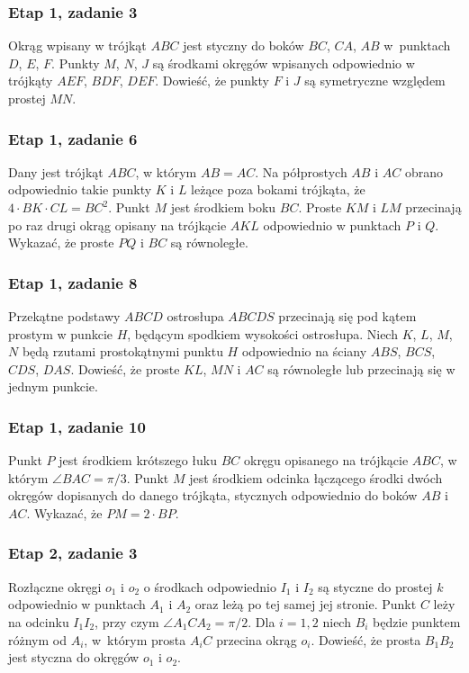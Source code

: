 
\subsubsection{Etap 1, zadanie 3}
Okrąg wpisany w trójkąt $ABC$ jest styczny do boków $BC$, $CA$, $AB$ w~punktach $D$, $E$, $F$.
Punkty $M$, $N$, $J$ są środkami okręgów wpisanych odpowiednio w trójkąty $AEF$, $BDF$, $DEF$.
Dowieść, że punkty $F$ i $J$ są symetryczne względem prostej $MN$.

\subsubsection{Etap 1, zadanie 6}
Dany jest trójkąt $ABC$, w którym $AB = AC$. Na półprostych $AB$ i $AC$ obrano odpowiednio takie punkty $K$ i $L$ leżące poza bokami trójkąta, że $4 \cdot BK \cdot CL = BC^2$.
Punkt $M$ jest środkiem boku $BC$.
Proste $KM$ i $LM$ przecinają po raz drugi okrąg opisany na trójkącie $AKL$ odpowiednio w punktach $P$ i $Q$.
Wykazać, że proste $PQ$ i $BC$ są równoległe.

\subsubsection{Etap 1, zadanie 8}
Przekątne podstawy $ABCD$ ostrosłupa $ABCDS$ przecinają się pod kątem prostym w punkcie $H$, będącym spodkiem wysokości ostrosłupa.
Niech $K$, $L$, $M$, $N$ będą rzutami prostokątnymi punktu $H$ odpowiednio na ściany $ABS$, $BCS$, $CDS$, $DAS$.
Dowieść, że proste $KL$, $MN$ i $AC$ są równoległe lub przecinają się w jednym punkcie.

\subsubsection{Etap 1, zadanie 10}
Punkt $P$ jest środkiem krótszego łuku $BC$ okręgu opisanego na trójkącie $ABC$, w którym $\angle BAC = \pi/3$.
Punkt $M$ jest środkiem odcinka łączącego środki dwóch okręgów dopisanych do danego trójkąta, stycznych odpowiednio do boków $AB$ i $AC$. Wykazać, że $PM = 2 \cdot BP$.

\subsubsection{Etap 2, zadanie 3}
Rozłączne okręgi $o_1$ i $o_2$ o środkach odpowiednio $I_1$ i $I_2$ są styczne do prostej $k$ odpowiednio w punktach $A_1$ i $A_2$ oraz leżą po tej samej jej stronie.
Punkt $C$ leży na odcinku $I_1I_2$, przy czym $\angle A_1 C A_2 = \pi/2$.
Dla $i = 1, 2$ niech $B_i$ będzie punktem różnym od $A_i$, w~którym prosta $A_iC$ przecina okrąg $o_i$.
Dowieść, że prosta $B_1B_2$ jest styczna do okręgów $o_1$ i $o_2$.

